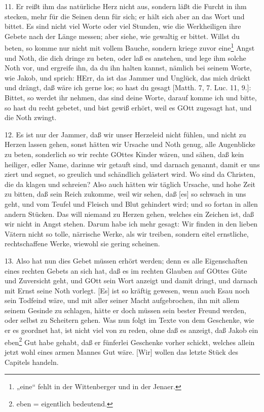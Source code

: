 11. Er reißt ihm das natürliche Herz nicht aus, sondern läßt die Furcht in ihm stecken, mehr für die Seinen denn für sich; er hält sich aber an das Wort und bittet. Es sind nicht viel Worte oder viel Stunden, wie die Werkheiligen ihre Gebete nach der Länge messen; aber siehe, wie gewaltig er bittet. Willst du beten, so komme nur nicht mit vollem Bauche, sondern kriege zuvor eine\footnote{„eine“ fehlt in der Wittenberger und in der Jenaer.} Angst und Noth, die dich dringe zu beten, oder laß es anstehen, und lege ihm solche Noth vor, und ergreife ihn, da du ihn halten kannst, nämlich bei seinem Worte, wie Jakob, und sprich: HErr, da ist das Jammer und Unglück, das mich drückt und drängt, daß wäre ich gerne los; so hast du gesagt [Matth. 7, 7. Luc. 11, 9.]: Bittet, so werdet ihr nehmen, das sind deine Worte, darauf komme ich und bitte, so hast du recht gebetet, und bist gewiß erhört, weil es GOtt zugesagt hat, und die Noth zwingt.

12. Es ist nur der Jammer, daß wir unser Herzeleid nicht fühlen, und nicht zu Herzen lassen gehen, sonst hätten wir Ursache und Noth genug, alle Augenblicke zu beten, sonderlich so wir rechte GOttes Kinder wären, und sähen, daß kein heiliger, edler Name, darinne wir getauft sind, und
darnach genannt, damit er uns ziert und segnet, so greulich und schändlich gelästert wird. Wo sind da Christen, die da klagen und schreien? Also auch hätten wir täglich Ursache, und hohe Zeit zu bitten, daß sein Reich zukomme, weil wir sehen, daß [es] so schwach in uns geht, und vom Teufel und Fleisch und Blut gehindert wird; und so fortan in allen andern Stücken. Das will niemand zu Herzen gehen, welches ein Zeichen ist, daß wir nicht in Angst stehen. Darum habe ich mehr gesagt: Wir finden in den lieben Vätern nicht so tolle, närrische Werke, als wir treiben, sondern eitel ernstliche, rechtschaffene Werke, wiewohl sie gering scheinen.

13. Also hat nun dies Gebet müssen erhört werden; denn es alle Eigenschaften eines rechten Gebets an sich hat, daß es im rechten Glauben auf GOttes Güte und Zuversicht geht, und GOtt sein Wort anzeigt und damit dringt, und darnach mit Ernst seine Noth vorlegt. [Es] ist so kräftig gewesen, wenn auch Esau noch sein Todfeind wäre, und mit aller seiner Macht aufgebrochen, ihn mit allem seinem Gesinde zu schlagen, hätte er doch müssen sein bester Freund werden, oder selbst zu Scheitern gehen. Was nun folgt im Texte von dem Geschenke, wie er es geordnet hat, ist nicht viel von zu reden, ohne daß es anzeigt, daß Jakob ein eben\footnote{eben = eigentlich bedeutend.} Gut habe gehabt, daß er fünferlei Geschenke vorher schickt, welches allein jetzt wohl eines armen Mannes Gut wäre. [Wir] wollen das letzte Stück des Capitels handeln.

